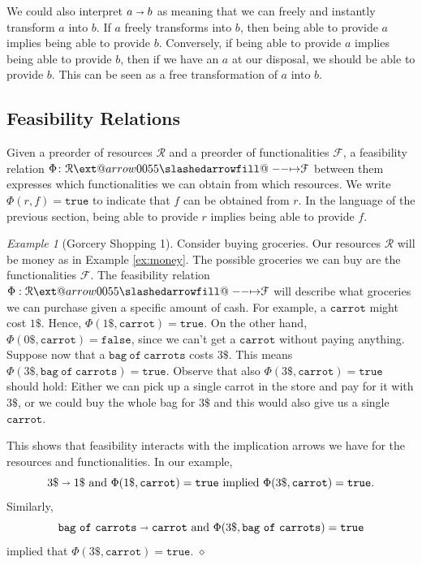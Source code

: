 \documentclass[12pt]{article}
\makeatletter
\theoremstyle{definition}
\theoremstyle{plain}
\theoremstyle{plain}
\theoremstyle{plain}
\theoremstyle{plain}
\theoremstyle{remark}
\newtheorem{example}[definition]{Example}
\newcommand\xqed[1]{%
	\leavevmode\unskip\penalty9999 \hbox{}\nobreak\hfill
	\quad\hbox{#1}}
\newcommand\exampleend{\xqed{$\diamond$}}
\theoremstyle{remark}
\newcommand{\mc}[1]{\mathcal{#1}}
\newcommand{\true}{\mathtt{true}}
\def\slashedarrowfill@#1#2#3#4#5{%
	$\m@th\thickmuskip0mu\medmuskip\thickmuskip\thinmuskip\thickmuskip
	\relax#5#1\mkern-7mu%
	\cleaders\hbox{$#5\mkern-2mu#2\mkern-2mu$}\hfill
	\mathclap{#3}\mathclap{#2}%
	\cleaders\hbox{$#5\mkern-2mu#2\mkern-2mu$}\hfill
	\mkern-7mu#4$%
}
\def\rightslashedarrowfill@{%
	\slashedarrowfill@\relbar\relbar\mapstochar\rightarrow}
\newcommand\xslashedrightarrow[2][]{%
	\ext@arrow 0055{\rightslashedarrowfill@}{#1}{#2}}
\makeatother
\begin{document}
\begin{tcolorbox}[title= Transformation Interpretation]
	We could also interpret $a \shortrightarrow b$ as meaning that we can freely and instantly transform $a$ into $b$. If $a$ freely transforms into $b$, then being able to provide $a$ implies being able to provide $b$. Conversely, if being able to provide $a$ implies being able to provide $b$, then if we have an $a$ at our disposal, we should be able to provide $b$. This can be seen as a free transformation of $a$ into $b$.
\end{tcolorbox}


\subsection{Feasibility Relations}
Given a preorder of resources $\mc{R}$ and a preorder of functionalities $\mc{F}$, a feasibility relation $\Phi \colon \mc{R} \xslashedrightarrow{} \mc{F}$ between them expresses which functionalities we can obtain from which resources. We write $\Phi(r,f) = \mathtt{true}$ to indicate that $f$ can be obtained from $r$. In the language of the previous section, being able to provide $r$ implies being able to provide $f$.

\begin{example}[Gorcery Shopping 1]\label{ex:groceries}
	Consider buying groceries. Our resources $\mc{R}$ will be money as in Example \ref{ex:money}. The possible groceries we can buy are the functionalities $\mc{F}$. The feasibility relation $\Phi: \mc{R} \xslashedrightarrow{} \mc{F}$ will describe what groceries we can purchase given a specific amount of cash. For example, a $\mathtt{carrot}$ might cost $1\$$. Hence, $\Phi(1\$,\mathtt{carrot}) = \mathtt{true}$. On the other hand, $\Phi(0\$, \mathtt{carrot}) = \mathtt{false}$, since we can't get a $\mathtt{carrot}$ without paying anything. Suppose now that a $\mathtt{bag\ of\ carrots}$ costs $3\$$. This means $\Phi(3\$,\mathtt{bag\ of\ carrots}) = \mathtt{true}$. Observe that also $\Phi(3\$,\mathtt{carrot}) = \true$ should hold: Either we can pick up a single carrot in the store and pay for it with $3\$$, or we could buy the whole bag for $3\$$ and this would also give us a single $\mathtt{carrot}$. 
	
	This shows that feasibility interacts with the implication arrows we have for the resources and functionalities. In our example,
	$$3\$ \shortrightarrow 1\$ \text{ and } \Phi(1\$, \mathtt{carrot}) = \true  \text{ implied } \Phi(3\$, \mathtt{carrot}) = \true.$$ 
	Similarly, 
	$$\mathtt{bag\ of\ carrots} \shortrightarrow \mathtt{carrot}  \text{ and } \Phi(3\$,\mathtt{bag\ of\ carrots}) = \mathtt{true} $$ 
	implied that $\Phi(3\$,\mathtt{carrot}) = \true.$ \exampleend
\end{example}
\end{document}
